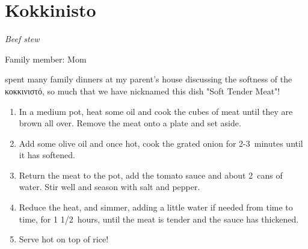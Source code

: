 \chapter{Kokkinisto}
\label{ch:kokkinisto}


\textit{Beef stew}

Family member: Mom

 spent many family dinners at my parent's house discussing the softness of the \textgreek{κοκκινιστό}, so much that we have nicknamed this dish "Soft Tender Meat"!

\begin{enumerate}
    \item In a medium pot, heat some oil and cook the cubes of meat until they are brown all over. Remove the meat onto a plate and set aside.
    \item Add some olive oil and once hot, cook the grated onion for 2-3~minutes until it has softened.
    \item Return the meat to the pot, add the tomato sauce and about 2~cans of water. Stir well and season with salt and pepper.
    \item Reduce the heat, and simmer, adding a little water if needed from time to time, for 1 1/2~hours, until the meat is tender and the sauce has thickened.
    \item Serve hot on top of rice!
\end{enumerate}

